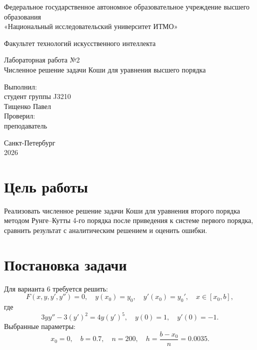 \documentclass[12pt,a4paper]{article}
\begin{document}
\begin{titlepage}
\begin{center}
Федеральное государственное автономное образовательное учреждение высшего образования\\
«Национальный исследовательский университет ИТМО»
\end{center}

\vspace{1cm}
\begin{center}
Факультет технологий искусственного интеллекта
\end{center}

\vfill
\begin{center}
{\Large Лабораторная работа №2}\\[0.4cm]
{\large Численное решение задачи Коши для уравнения высшего порядка}
\end{center}
\vfill

\begin{flushright}
Выполнил:\\
студент группы J3210\\
Тищенко Павел\\[0.8cm]
Проверил:\\
преподаватель\\
\underline{\hspace{4cm}}
\end{flushright}

\vfill
\begin{center}
Санкт-Петербург\\
2026
\end{center}
\end{titlepage}

\tableofcontents
\newpage

\section{Цель работы}
Реализовать численное решение задачи Коши для уравнения второго порядка методом Рунге--Кутты 4-го порядка после приведения к системе первого порядка, сравнить результат с аналитическим решением и оценить ошибки.

\section{Постановка задачи}
Для варианта 6 требуется решить:
\[
F(x,y,y',y'')=0,\quad y(x_0)=y_0,\quad y'(x_0)=y_0',\quad x\in[x_0,b],
\]
где
\[
3yy''-3(y')^2=4y(y')^5,\quad y(0)=1,\quad y'(0)=-1.
\]
Выбранные параметры:
\[
x_0=0,\quad b=0.7,\quad n=200,\quad h=\frac{b-x_0}{n}=0.0035.
\]
\end{document}
